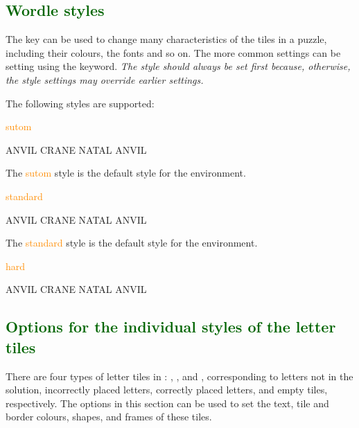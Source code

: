 \documentclass[svgnames]{report}
\newcommand\Section[1]{\subsection{\textcolor{DarkGreen}{#1}}}
\begin{document}
  \Section{Wordle styles}

  The  key can be used to change many characteristics of
  the tiles in a  puzzle, including their colours, the
  fonts and so on.  The more common settings can be setting using the
   keyword. \textit{The style should always be set first
  because, otherwise, the style settings may override earlier settings.}

  The following styles are supported:

  \textcolor{DarkOrange}{sutom}

  \begin{example}
  \begin{wordle}[style=sutom]{ANVIL}
    CRANE
    NATAL
    ANVIL
  \end{wordle}
  \end{example}

  The \textcolor{DarkOrange}{sutom} style is the default
  style for the  environment.

  \textcolor{DarkOrange}{standard}

  \begin{example}
  \begin{wordle}[style=standard]{ANVIL}
    CRANE
    NATAL
    ANVIL
  \end{wordle}
  \end{example}

  The \textcolor{DarkOrange}{standard} style is the default style for the
   environment.

  \textcolor{DarkOrange}{hard}

  \begin{example}
  \begin{wordle}[style=hard]{ANVIL}
    CRANE
    NATAL
    ANVIL
  \end{wordle}
  \end{example}

  \Section{Options for the individual styles of the letter tiles}

  There are four types of letter tiles in :
  , ,  and
  , corresponding to letters not in the solution,
  incorrectly placed letters, correctly placed letters, and empty
  tiles, respectively. The options in this section can be used to set
  the text, tile and border colours, shapes, and frames of these tiles.
\end{document}

